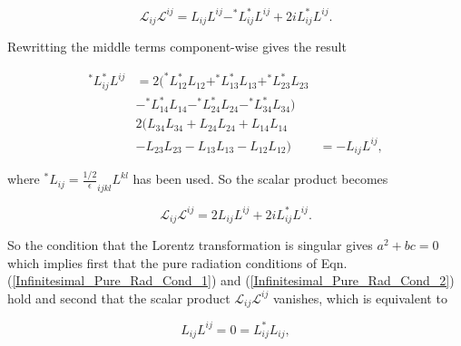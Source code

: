 \begin{appendix}
\begin{equation*}
\mathcal{L}_{ij} \mathcal{L}^{ij} = L_{ij}L^{ij} - ^{*}L_{ij}^{*}L^{ij} +2i L_{ij}^{*}L^{ij}.
\end{equation*}

\noindent Rewritting the middle terms component-wise gives the result

\begin{align*}
^{*}L_{ij} ^{*}L^{ij} & = 2 ( ^{*}L_{12} ^{*}L_{12} + ^{*}L_{13} ^{*}L_{13} + ^{*}L_{23} ^{*}L_{23} \\
                     & - ^{*}L_{14} ^{*}L_{14} - ^{*}L_{24} ^{*}L_{24} - ^{*}L_{34} ^{*}L_{34}) \\
                     & 2( L_{34}L_{34} + L_{24}L_{24} + L_{14}L_{14} \\
                     & - L_{23}L_{23} - L_{13}L_{13} - L_{12}L_{12})
                     & = - L_{ij}L^{ij},
\end{align*}

\noindent where $^{*}L_{ij} = \frac{1/2}\epsilon_{ijkl}L^{kl}$ has been used. So the scalar product becomes

\begin{equation*}
\mathcal{L}_{ij} \mathcal{L}^{ij} = 2 L_{ij}L^{ij} + 2i L_{ij}^{*}L^{ij}.
\end{equation*}

\noindent So the condition that the Lorentz transformation is singular gives $a^2 + bc = 0$ which implies first that the pure radiation conditions of Eqn.(\ref{Infinitesimal_Pure_Rad_Cond_1}) and (\ref{Infinitesimal_Pure_Rad_Cond_2}) hold and second that the scalar product $\mathcal{L}_{ij} \mathcal{L}^{ij}$ vanishes, which is equivalent to 
   
\begin{equation*}
L_{ij}L^{ij} = 0 = L_{ij} ^{*}L_{ij},
\end{equation*}

\end{appendix}
